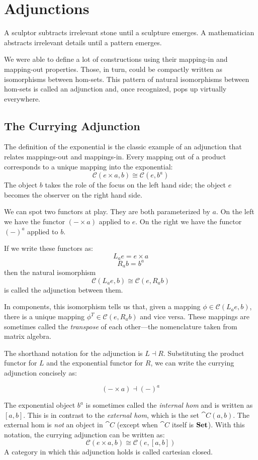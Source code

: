 \documentclass[DaoFP]{subfiles}
\begin{document}
\setcounter{chapter}{9}

\chapter{Adjunctions}

A sculptor subtracts irrelevant stone until a sculpture emerges. A mathematician abstracts irrelevant details until a pattern emerges.

We were able to define a lot of constructions using their mapping-in and mapping-out properties. Those, in turn, could be compactly written as isomorphisms between hom-sets. This pattern of natural isomorphisms between hom-sets is called an adjunction and, once recognized, pops up virtually everywhere.

\section{The Currying Adjunction}

The definition of the exponential is the classic example of an adjunction that relates mappings-out and mappings-in. Every mapping out of a product corresponds to a unique mapping into the exponential:
\[  \mathcal{C}(e \times a, b ) \cong  \mathcal{C} (e, b^a)  \]
The object $b$ takes the role of the focus on the left hand side; the object $e$ becomes the observer on the right hand side. 

We can spot two functors at play. They are both parameterized by $a$. On the left we have the functor $(- \times a)$ applied to $e$. On the right we have the functor $(-)^a$ applied to $b$. 

If we write these functors as:
\[ L_a e = e \times a \]
\[ R_a b = b^a \]
then the natural isomorphism
\[ \mathcal{C}(L_a e, b) \cong \mathcal{C}(e, R_a b) \]
is called the adjunction between them. 

In components, this isomorphism tells us that, given a mapping $\phi \in \mathcal{C}(L_a e, b)$, there is a unique mapping $\phi^T \in \mathcal{C}(e, R_a b)$ and vice versa. These mappings are sometimes called the \emph{transpose} of each other---the nomenclature taken from matrix algebra.

The shorthand notation for the adjunction is $L \dashv R$. Substituting the product functor for $L$ and the exponential functor for $R$, we can write the currying adjunction concisely as:

\[ (- \times a) \dashv (-)^a \]

The exponential object $b^a$ is sometimes called the \emph{internal hom} and is written as $[a, b]$. This is in contrast to the \emph{external hom}, which is the set $\cat C (a, b)$. The external hom is \emph{not} an object in $\cat C$ (except when $\cat C$ itself is $\mathbf{Set}$). With this notation, the currying adjunction can be written as:
\[  \mathcal{C}(e \times a, b) \cong  \mathcal{C} (e, [a, b])  \]
A category in which this adjunction holds is called cartesian closed.
\end{document}
